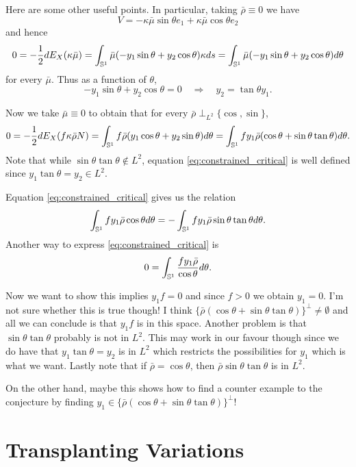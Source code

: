 \documentclass[12pt]{article}
\begin{document}
\begin{rem}
{\color{red} Here are some other useful points.}
In particular, taking \(\bar{\rho} \equiv 0\) we have
\[
V = -\kappa\bar{\mu}\sin\theta e_1 + \kappa\bar{\mu}\cos\theta e_2
\]
and hence
\[
0 = -\frac{1}{2} dE_X(\kappa\bar{\mu}) = \int_{\operatorname{\mathbb{S}^1}} \bar{\mu}(-y_1 \sin\theta + y_2 \cos\theta) \kappa ds = \int_{\operatorname{\mathbb{S}^1}} \bar{\mu}(-y_1 \sin\theta + y_2 \cos\theta) d\theta
\]
for every \(\bar{\mu}\). Thus as a function of \(\theta\),
\[
-y_1 \sin\theta + y_2 \cos\theta = 0 \quad \Rightarrow \quad y_2 = \tan\theta y_1.
\]

Now we take \(\bar{\mu} \equiv 0\) to obtain that for every \(\bar{\rho} \perp_{L^2} \{\cos,\sin\}\),
\begin{equation}
\label{eq:constrained_critical}
0 = -\frac{1}{2} dE_X(f\kappa\bar{\rho} N) = \int_{\operatorname{\mathbb{S}^1}} f\bar{\rho}(y_1 \cos\theta + y_2 \sin\theta) d\theta = \int_{\operatorname{\mathbb{S}^1}} f y_1 \bar{\rho}(\cos\theta + \sin\theta\tan\theta) d\theta.
\end{equation}
Note that while \(\sin\theta\tan\theta \notin L^2\), equation \eqref{eq:constrained_critical} is well defined since \(y_1 \tan\theta = y_2 \in L^2\).

Equation \eqref{eq:constrained_critical} gives us the relation
\[
\int_{\operatorname{\mathbb{S}^1}} f y_1 \bar{\rho} \cos\theta d\theta = - \int_{\operatorname{\mathbb{S}^1}} f y_1 \bar{\rho} \sin\theta\tan\theta d\theta.
\]
Another way to express \eqref{eq:constrained_critical} is
\[
0 = \int_{\operatorname{\mathbb{S}^1}} \frac{f y_1 \bar{\rho}}{\cos\theta} d\theta.
\]


{\color{red} Now we want to show this implies $y_1f = 0$ and since \(f > 0\) we obtain \(y_1 = 0\). I'm not sure whether this is true though! I think \(\{\bar{\rho}(\cos\theta + \sin\theta\tan\theta)\}^{\perp} \ne \emptyset\) and all we can conclude is that \(y_1 f\) is in this space. Another problem is that \(\sin\theta\tan\theta\) probably is not in \(L^2\). This may work in our favour though since we do have that \(y_1 \tan\theta = y_2\) is in \(L^2\) which restricts the possibilities for \(y_1\) which is what we want. Lastly note that if \(\bar{\rho} = \cos\theta\), then \(\bar{\rho} \sin\theta\tan\theta\) is in \(L^2\).

On the other hand, maybe this shows how to find a counter example to the conjecture by finding \(y_1 \in \{\bar{\rho}(\cos\theta + \sin\theta\tan\theta)\}^{\perp}\)!}
\end{rem}

\section{Transplanting Variations}
\end{document}
